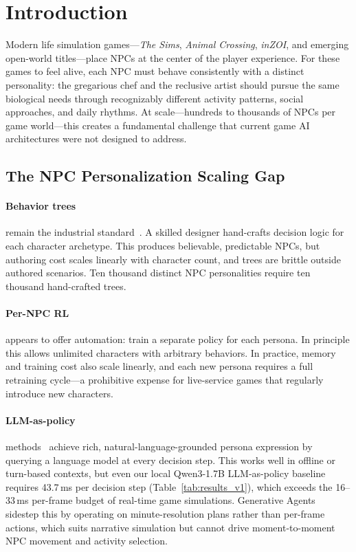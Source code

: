 \documentclass[conference]{IEEEtran}
\begin{document}
\section{Introduction}
\label{sec:intro}

Modern life simulation games---\textit{The Sims}, \textit{Animal Crossing},
\textit{inZOI}, and emerging open-world titles---place NPCs at the center of
the player experience. For these games to feel alive, each NPC must behave
consistently with a distinct personality: the gregarious chef and the reclusive
artist should pursue the same biological needs through recognizably different
activity patterns, social approaches, and daily rhythms. At scale---hundreds to
thousands of NPCs per game world---this creates a fundamental challenge that
current game AI architectures were not designed to address.

\subsection{The NPC Personalization Scaling Gap}

\paragraph{Behavior trees} remain the industrial standard~\cite{yannakakis2018ai}.
A skilled designer hand-crafts decision logic for each character archetype.
This produces believable, predictable NPCs, but authoring cost scales linearly
with character count, and trees are brittle outside authored scenarios.
Ten thousand distinct NPC personalities require ten thousand hand-crafted trees.

\paragraph{Per-NPC RL} appears to offer automation: train a separate policy for
each persona. In principle this allows unlimited characters with arbitrary
behaviors. In practice, memory and training cost also scale linearly, and each
new persona requires a full retraining cycle---a prohibitive expense for
live-service games that regularly introduce new characters.

\paragraph{LLM-as-policy} methods~\cite{park2023generative,wang2023voyager,yao2023react}
achieve rich, natural-language-grounded persona expression by querying a language
model at every decision step. This works well in offline or turn-based contexts,
but even our local Qwen3-1.7B LLM-as-policy baseline requires 43.7\,ms per
decision step (Table~\ref{tab:results_v1}),
which exceeds the 16--33\,ms per-frame budget of real-time game simulations.
Generative Agents~\cite{park2023generative} sidestep this by operating on
minute-resolution plans rather than per-frame actions, which suits narrative
simulation but cannot drive moment-to-moment NPC movement and activity selection.
\end{document}
